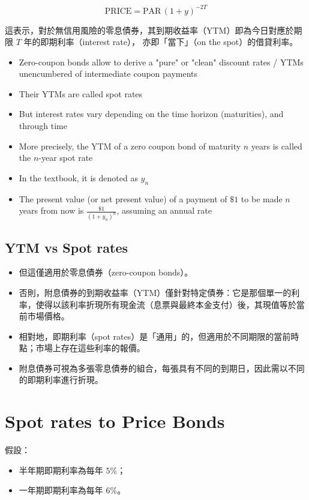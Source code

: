 \documentclass[letterpaper]{article}
\begin{document}
\[
\text{PRICE} = \text{PAR} \, (1 + y)^{-2T}
\]

這表示，對於無信用風險的零息債券，其到期收益率（YTM）即為今日對應於期限 \( T \) 年的即期利率（interest rate），  
亦即「當下」（on the spot）的借貸利率。


\begin{itemize}
  \item Zero-coupon bonds allow to derive a "pure" or "clean" discount rates / YTMs unencumbered of intermediate coupon payments
  \item Their YTMs are called spot rates
  \item But interest rates vary depending on the time horizon (maturities), and through time
  \item More precisely, the YTM of a zero coupon bond of maturity $n$ years is called the $n$-year spot rate
  \item In the textbook, it is denoted as $y_{n}$
  \item The present value (or net present value) of a payment of $\$ 1$ to be made $n$ years from now is $\frac{\$ 1}{\left(1+y_{n}\right)^{n}}$, assuming an annual rate
\end{itemize}

\subsection{YTM vs Spot rates}
\begin{itemize}
	\item 但這僅適用於零息債券（zero-coupon bonds）。
	\item 否則，附息債券的到期收益率（YTM）僅針對特定債券：它是那個單一的利率，使得以該利率折現所有現金流（息票與最終本金支付）後，其現值等於當前市場價格。
	\item 相對地，即期利率（spot rates）是「通用」的，但適用於不同期限的當前時點；市場上存在這些利率的報價。
	\item 附息債券可視為多張零息債券的組合，每張具有不同的到期日，因此需以不同的即期利率進行折現。
\end{itemize}

\section*{Spot rates to Price Bonds}
假設：

\begin{itemize}
	\item 半年期即期利率為每年 \(5\%\)；
	\item 一年期即期利率為每年 \(6\%\)。
\end{itemize}
\end{document}
